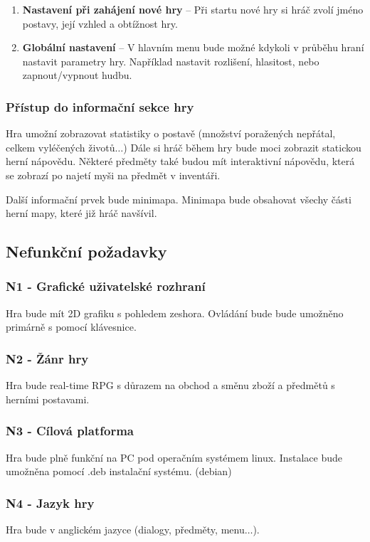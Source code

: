 \documentclass[12pt,a4paper]{article}
\begin{document}
\begin{enumerate}
  \item{\textbf{Nastavení při zahájení nové hry} -- Při startu nové hry si hráč
    zvolí jméno postavy, její vzhled a obtížnost hry.}
  \item{\textbf{Globální nastavení} -- V hlavním menu bude možné kdykoli v
    průběhu hraní nastavit parametry hry. Například nastavit rozlišení,
    hlasitost, nebo zapnout/vypnout hudbu.}
\end{enumerate}

\subsubsection{Přístup do informační sekce hry}
Hra umožní zobrazovat statistiky o postavě (množství poražených nepřátal,
celkem vyléčených životů$\dots$) Dále si hráč během hry bude moci zobrazit statickou
herní nápovědu. Některé předměty také budou mít interaktivní nápovědu, která se
zobrazí po najetí myši na předmět v inventáři.  

Další informační prvek bude minimapa. Minimapa bude obsahovat všechy části herní
mapy, které již hráč navšívil.

\subsection{Nefunkční požadavky}

\subsubsection{N1 -  Grafické uživatelské rozhraní  }
  Hra bude mít 2D grafiku s pohledem zeshora. Ovládání bude bude umožněno
  primárně s pomocí klávesnice.

\subsubsection{N2 - Žánr hry}
  Hra bude real-time RPG s důrazem na obchod a směnu zboží a předmětů s herními
  postavami.

\subsubsection{N3 - Cílová platforma}
Hra bude plně funkční na PC pod operačním systémem linux. Instalace bude
umožněna pomocí .deb instalační systému. (debian)

\subsubsection{N4 - Jazyk hry}
Hra bude v anglickém jazyce (dialogy, předměty, menu$\dots$).
\end{document}
